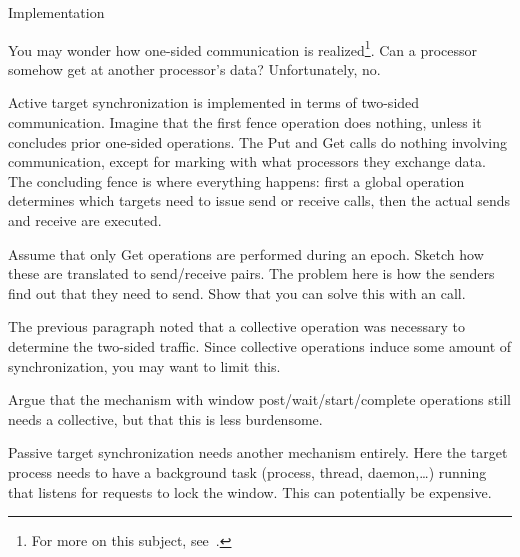  {Implementation}

You may wonder how one-sided communication is realized\footnote{For
  more on this subject, see~\cite{thakur:ijhpca-sync}.}. Can a processor
somehow get at another processor's data? Unfortunately, no.

Active target synchronization is implemented in terms of two-sided communication.
Imagine that the first fence operation does nothing, unless it concludes prior
one-sided operations. The Put and Get calls do nothing involving communication,
except for marking with what processors they exchange data.
The concluding fence is where everything happens: first a global operation
determines which targets need to issue send or receive calls, then the
actual sends and receive are executed.

\begin{exercise}
  Assume that only Get operations are performed during an epoch. 
  Sketch how these are translated to send/receive pairs. 
  The problem here is how the senders find out that they need to send.
  Show that you can solve this with an  call.
\end{exercise}

The previous paragraph noted that a collective operation was necessary
to determine the two-sided traffic. Since collective operations induce
some amount of synchronization, you may want to limit this.

\begin{exercise}
  Argue that the mechanism with window post/wait/start/complete operations
  still needs a collective, but that this is less burdensome.
\end{exercise}

Passive target synchronization needs another mechanism entirely.  Here
the target process needs to have a background task (process, thread,
daemon,\ldots) running that listens for requests to lock the
window. This can potentially be expensive.


